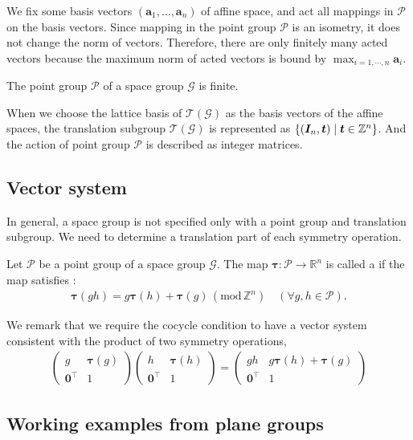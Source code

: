 We fix some basis vectors $(\bm{a}_{1}, \dots, \bm{a}_{n})$ of affine space, and act all mappings in $\mathcal{P}$ on the basis vectors.
Since mapping in the point group $\mathcal{P}$ is an isometry, it does not change the norm of vectors.
Therefore, there are only finitely many acted vectors because the maximum norm of acted vectors is bound by $\max_{i=1,\cdots,n} \mathbf{a}_{i}$.

\begin{screen}
  \begin{theorem}
    The point group $\mathcal{P}$ of a space group $\mathcal{G}$ is finite.
  \end{theorem}
\end{screen}

When we choose the lattice basis of $\mathcal{T}(\mathcal{G})$ as the basis vectors of the affine spaces, the translation subgroup $\mathcal{T}(\mathcal{G})$ is represented as $\left\{  (\bm{I}_{n}, \bm{t})  \mathrel{}\middle|\mathrel{}  \bm{t} \in \mathbb{Z}^{n}  \right\}$.
And the action of point group $\mathcal{P}$ is described as integer matrices.

\subsection{Vector system}

In general, a space group is not specified only with a point group and translation subgroup.
We need to determine a translation part of each symmetry operation.

\begin{screen}
  \begin{definition}
    Let $\mathcal{P}$ be a point group of a space group $\mathcal{G}$.
    The map $\bm{\tau}: \mathcal{P} \to \mathbb{R}^{n}$ is called a  if the map satisfies :
    \begin{align}
      \bm{\tau}(gh) = g \bm{\tau}(h) + \bm{\tau}(g) \, ( \mathrm{mod} \, \mathbb{Z}^{n}) \quad (\forall g, h \in \mathcal{P}).
    \end{align}
  \end{definition}
\end{screen}

We remark that we require the cocycle condition to have a vector system consistent with the product of two symmetry operations,
\begin{align*}
  \begin{pmatrix}
    g & \bm{\tau}(g) \\
    \bm{0}^{\top} & 1
  \end{pmatrix}
  \begin{pmatrix}
    h & \bm{\tau}(h) \\
    \bm{0}^{\top} & 1
  \end{pmatrix}
  =
  \begin{pmatrix}
    gh & g \bm{\tau}(h) + \bm{\tau}(g) \\
    \bm{0}^{\top} & 1
  \end{pmatrix}
\end{align*}


\subsection{Working examples from plane groups}

